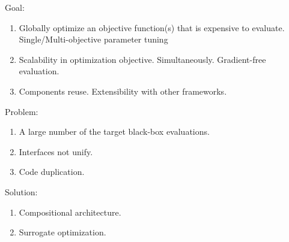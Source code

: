         Goal:
        \begin{enumerate}
            \item Globally optimize an objective function(s) that is expensive to evaluate. Single/Multi-objective parameter tuning
            \item Scalability in optimization objective. Simultaneously. Gradient-free evaluation.
            \item Components reuse. Extensibility with other frameworks.
        \end{enumerate}

        Problem:
        \begin{enumerate}
            \item A large number of the target black-box evaluations.
            \item Interfaces not unify.
            \item Code duplication.
        \end{enumerate}

        Solution:
        \begin{enumerate}
            \item Compositional architecture.
            \item Surrogate optimization.
        \end{enumerate}

